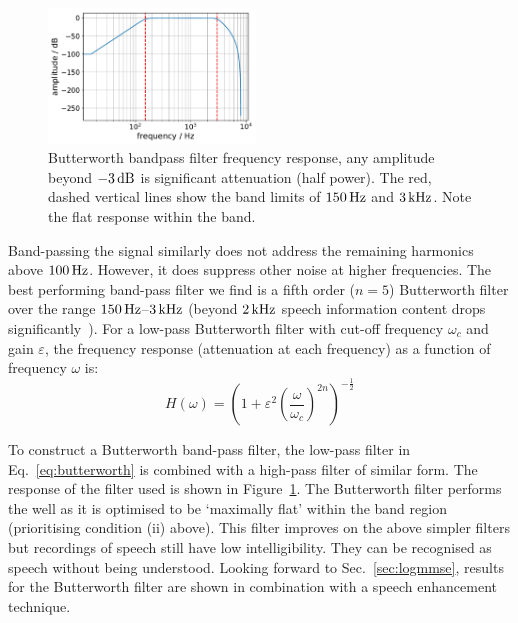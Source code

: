 \documentclass[paper-main.tex]{subfiles}
\begin{document}


\begin{figure}
	\includegraphics[width=0.49\textwidth]{figures/butterworth_150_3000.pdf}
	\caption{Butterworth bandpass filter frequency response, any amplitude beyond $-3\,{\rm dB}$ is significant attenuation (half power). The red, dashed vertical lines show the band limits of $150\,{\rm Hz}$ and $3\,{\rm kHz}$. Note the flat response within the band.}
	\label{fig:butterworth}
\end{figure}


Band-passing the signal similarly does not address the remaining harmonics above $100\,{\rm Hz}$. 
However, it does suppress other noise at higher frequencies. 
The best performing band-pass filter we find is a fifth order ($n = 5$) Butterworth filter over the range $150\,{\rm Hz}$--$3\,{\rm kHz}$ (beyond $2\,{\rm kHz}$ speech information content drops significantly~\cite{speech_intelligibility}). 
For a low-pass Butterworth filter with cut-off frequency $\omega_c$ and gain $\varepsilon$, the frequency response (attenuation at each frequency) as a function of frequency $\omega$ is:
\begin{equation}
\label{eq:butterworth}
H(\omega) = \left(1+\varepsilon^2 \left( \frac{\omega}{\omega_c} \right)^{2n}\right)^{-\frac{1}{2}}
\end{equation}

To construct a Butterworth band-pass filter, the low-pass filter in Eq.~\ref{eq:butterworth} is combined with a high-pass filter of similar form. 
The response of the filter used is shown in Figure~\ref{fig:butterworth}. 
The Butterworth filter performs the well as it is optimised to be `maximally flat' within the band region (prioritising condition (ii) above).
This filter improves on the above simpler filters but recordings of speech still have low intelligibility.
They can be recognised as speech without being understood.
Looking forward to Sec.~\ref{sec:logmmse}, results for the Butterworth filter are shown in combination with a speech enhancement technique. 
\end{document}
